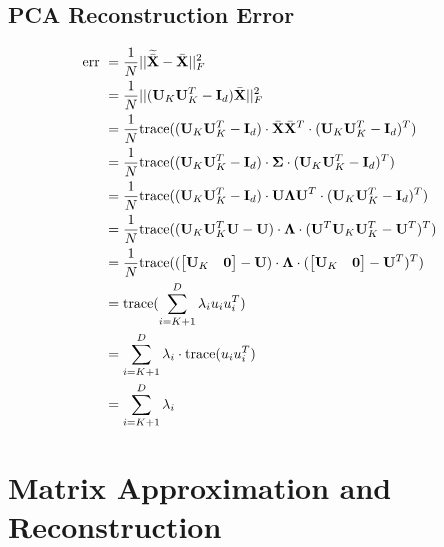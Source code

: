 \documentclass[12pt]{article}
\begin{document}
\subsection{PCA Reconstruction Error}
\begin{equation*}
\begin{split}
\text{err } &= \frac{1}{N} ||\widetilde{\bar{\mathbf{X}}} - \bar{\mathbf{X}}||^2_F \\
&= \frac{1}{N} || (\mathbf{U}_K\mathbf{U}_K^T - \mathbf{I}_d) \bar{\mathbf{X}}||^2_F \\
&= \frac{1}{N} \text{trace}((\mathbf{U}_K\mathbf{U}_K^T - \mathbf{I}_d)\cdot \bar{\mathbf{X}}\bar{\mathbf{X}}^T \cdot (\mathbf{U}_K\mathbf{U}_K^T - \mathbf{I}_d)^T) \\
&= \frac{1}{N} \text{trace}((\mathbf{U}_K\mathbf{U}_K^T - \mathbf{I}_d)\cdot \mathbf{\Sigma} \cdot (\mathbf{U}_K\mathbf{U}_K^T - \mathbf{I}_d)^T) \\
&= \frac{1}{N} \text{trace}((\mathbf{U}_K\mathbf{U}_K^T - \mathbf{I}_d)\cdot \mathbf{U\Lambda U}^T \cdot (\mathbf{U}_K\mathbf{U}_K^T - \mathbf{I}_d)^T) \\
&= \frac{1}{N} \text{trace}((\mathbf{U}_K\mathbf{U}_K^T \mathbf{U} - \mathbf{U})\cdot \mathbf{\Lambda} \cdot (\mathbf{U}^T\mathbf{U}_K\mathbf{U}_K^T - \mathbf{U}^T)^T) \\
&= \frac{1}{N} \text{trace}((\begin{bmatrix} \mathbf{U}_K & \mathbf{0} \end{bmatrix} - \mathbf{U})\cdot \mathbf{\Lambda} \cdot (\begin{bmatrix} \mathbf{U}_K & \mathbf{0} \end{bmatrix} - \mathbf{U}^T)^T) \\
&= \text{trace}( \sum_{i=K+1}^D \lambda_i u_i u_i^T ) \\
&= \sum_{i=K+1}^D \lambda_i \cdot \text{trace}(u_i u_i^T) \\
&= \sum_{i=K+1}^D \lambda_i
\end{split}
\end{equation*}

\section{Matrix Approximation and Reconstruction}
\end{document}
